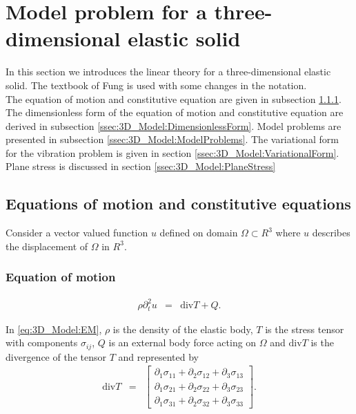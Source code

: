 \documentclass[../../main.tex]{subfiles}
\begin{document}
\section{Model problem for a three-dimensional elastic solid} \label{sec:3D_Model}
In this section we introduces the linear theory for a three-dimensional elastic
solid. The textbook of Fung \cite{Fung65} is used with some changes in the
notation. \\

The equation of motion and constitutive equation are given in subsection
\ref{ssec:3D_Model:EquationOfMotion}. The dimensionless form of the equation of
motion and constitutive equation are derived in subsection
\ref{ssec:3D_Model:DimensionlessForm}. Model problems are presented in
subsection \ref{ssec:3D_Model:ModelProblems}. The variational form for the
vibration problem is given in section \ref{ssec:3D_Model:VariationalForm}.
Plane stress is discussed in section \ref{ssec:3D_Model:PlaneStress}

\subsection{Equations of motion and constitutive equations} \label{ssec:3D_Model:EquationofMotion+ConstitutiveEquation}
Consider a vector valued function $u$ defined on domain $\Omega \subset {R}^3$ \label{sym:Omega} \label{sym:Rn}
where $u$\label{sym:u} describes the displacement of $\Omega$ in ${R}^3$.
\subsubsection{Equation of motion}\label{ssec:3D_Model:EquationOfMotion}
\begin{eqnarray}
	\rho\partial_t^2 u & = & \textrm{div}T + Q. \label{eq:3D_Model:EM}
\end{eqnarray} \label{sym:rho} \label{sym:partial_diff} \label{sym:T} \label{sym:Q}

In \eqref{eq:3D_Model:EM}, $\rho$ is the density of the elastic body, $T$ is
the stress tensor with components $\sigma_{ij}$\label{sym:sigmaij}, $Q$ is an external body force
acting on $\Omega$ and $\textrm{div}T$\label{sym:divT} is the divergence of the tensor $T$ and
represented by
\begin{eqnarray}
	\textrm{div}  T & = &
	\begin{bmatrix}
		\partial_1 \sigma_{11} + \partial_2 \sigma_{12} + \partial_3 \sigma_{13} \\
		\partial_1 \sigma_{21} + \partial_2 \sigma_{22} + \partial_3 \sigma_{23} \\
		\partial_1 \sigma_{31} + \partial_2 \sigma_{32} + \partial_3 \sigma_{33}
	\end{bmatrix}. \label{eq:3D_Model:divT}
\end{eqnarray}
\end{document}
